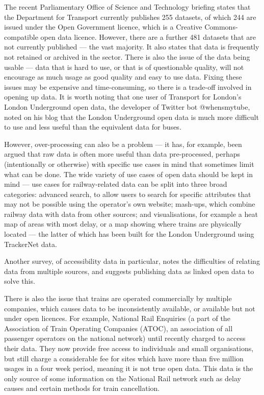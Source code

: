 \documentclass[a4paper,12pt]{report}
\begin{document}
The recent Parliamentary Office of Science and Technology
briefing\cite{POSTnote472} states that the Department for Transport currently
publishes 255 datasets, of which 244 are issued under the Open Government
licence, which is a Creative Commons-compatible open data licence. However,
there are a further 481 datasets that are not currently published --- the vast
majority. It also states that data is frequently not retained or archived in
the sector. There is also the issue of the data being usable --- data that is
hard to use, or that is of questionable quality, will not encourage as much
usage as good quality and easy to use data. Fixing these issues may be
expensive and time-consuming, so there is a trade-off involved in opening up
data. It is worth noting that one user of Transport for London's London
Underground open data, the developer of Twitter bot @whensmytube, noted on his
blog that the London Underground open data is much more difficult to use and
less useful than the equivalent data for buses\cite{whensmytube}.

However, over-processing can also be a problem --- it has, for example, been
argued that raw data is often more useful than data pre-processed, perhaps
(intentionally or otherwise) with specific use cases in mind that sometimes
limit what can be done\cite{Robinson2009}. The wide variety of use cases of
open data should be kept in mind --- use cases for railway-related data can be
split into three broad categories\cite{Kuhn2011}: advanced search, to allow
users to search for specific attributes that may not be possible using the
operator's own website; mash-ups, which combine railway data with data from
other sources; and visualisations, for example a heat map of areas with most
delay, or a map showing where trains are physically located --- the latter of
which has been built for the London Underground using TrackerNet
data\cite{TrainTimesTube}.

Another survey, of accessibility data in particular, notes the difficulties of
relating data from multiple sources, and suggests publishing data as linked
open data to solve this\cite{Ding2014}.

There is also the issue that trains are operated commercially by multiple
companies, which causes data to be inconsistently available, or available but
not under open licences. For example, National Rail Enquiries (a part of the
Association of Train Operating Companies (ATOC), an association of all
passenger operators on the national network) until recently charged to access
their data. They now provide free access to individuals and small
organisations, but still charge a considerable fee for sites which have more
than five million usages in a four week period, meaning it is not true open
data. This data is the only source of some information on the National Rail
network such as delay causes and certain methods for train
cancellation\cite{CairnsSeminar2013}.
\end{document}
